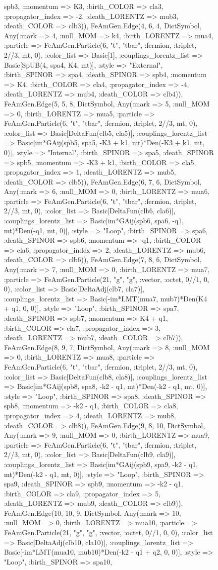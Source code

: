 \documentclass{revtex4}
\begin{document}
\begin{figure}[!htb]
\begin{center}
{spb3, :momentum => K3, :birth_COLOR => cla3, :propagator_index => -2, :death_LORENTZ => mub3, :death_COLOR => clb3)), FeAmGen.Edge(4, 6, 4, Dict{Symbol, Any}(:mark => 4, :null_MOM => k4, :birth_LORENTZ => mua4, :particle => FeAmGen.Particle(6, "t", "tbar", :fermion, :triplet, 2//3, mt, 0), :color_list => Basic[1], :couplings_lorentz_list => Basic[SpUB(4, spa4, K4, mt)], :style => "External", :birth_SPINOR => spa4, :death_SPINOR => spb4, :momentum => K4, :birth_COLOR => cla4, :propagator_index => -4, :death_LORENTZ => mub4, :death_COLOR => clb4)), FeAmGen.Edge(5, 5, 8, Dict{Symbol, Any}(:mark => 5, :null_MOM => 0, :birth_LORENTZ => mua5, :particle => FeAmGen.Particle(6, "t", "tbar", :fermion, :triplet, 2//3, mt, 0), :color_list => Basic[DeltaFun(clb5, cla5)], :couplings_lorentz_list => Basic[im*GAij(spb5, spa5, -K3 + k1, mt)*Den(-K3 + k1, mt, 0)], :style => "Internal", :birth_SPINOR => spa5, :death_SPINOR => spb5, :momentum => -K3 + k1, :birth_COLOR => cla5, :propagator_index => 1, :death_LORENTZ => mub5, :death_COLOR => clb5)), FeAmGen.Edge(6, 7, 6, Dict{Symbol, Any}(:mark => 6, :null_MOM => 0, :birth_LORENTZ => mua6, :particle => FeAmGen.Particle(6, "t", "tbar", :fermion, :triplet, 2//3, mt, 0), :color_list => Basic[DeltaFun(clb6, cla6)], :couplings_lorentz_list => Basic[im*GAij(spb6, spa6, -q1, mt)*Den(-q1, mt, 0)], :style => "Loop", :birth_SPINOR => spa6, :death_SPINOR => spb6, :momentum => -q1, :birth_COLOR => cla6, :propagator_index => 2, :death_LORENTZ => mub6, :death_COLOR => clb6)), FeAmGen.Edge(7, 8, 6, Dict{Symbol, Any}(:mark => 7, :null_MOM => 0, :birth_LORENTZ => mua7, :particle => FeAmGen.Particle(21, "g", "g", :vector, :octet, 0//1, 0, 0), :color_list => Basic[DeltaAdj(clb7, cla7)], :couplings_lorentz_list => Basic[-im*LMT(mua7, mub7)*Den(K4 + q1, 0, 0)], :style => "Loop", :birth_SPINOR => spa7, :death_SPINOR => spb7, :momentum => K4 + q1, :birth_COLOR => cla7, :propagator_index => 3, :death_LORENTZ => mub7, :death_COLOR => clb7)), FeAmGen.Edge(8, 9, 7, Dict{Symbol, Any}(:mark => 8, :null_MOM => 0, :birth_LORENTZ => mua8, :particle => FeAmGen.Particle(6, "t", "tbar", :fermion, :triplet, 2//3, mt, 0), :color_list => Basic[DeltaFun(clb8, cla8)], :couplings_lorentz_list => Basic[im*GAij(spb8, spa8, -k2 - q1, mt)*Den(-k2 - q1, mt, 0)], :style => "Loop", :birth_SPINOR => spa8, :death_SPINOR => spb8, :momentum => -k2 - q1, :birth_COLOR => cla8, :propagator_index => 4, :death_LORENTZ => mub8, :death_COLOR => clb8)), FeAmGen.Edge(9, 8, 10, Dict{Symbol, Any}(:mark => 9, :null_MOM => 0, :birth_LORENTZ => mua9, :particle => FeAmGen.Particle(6, "t", "tbar", :fermion, :triplet, 2//3, mt, 0), :color_list => Basic[DeltaFun(clb9, cla9)], :couplings_lorentz_list => Basic[im*GAij(spb9, spa9, -k2 - q1, mt)*Den(-k2 - q1, mt, 0)], :style => "Loop", :birth_SPINOR => spa9, :death_SPINOR => spb9, :momentum => -k2 - q1, :birth_COLOR => cla9, :propagator_index => 5, :death_LORENTZ => mub9, :death_COLOR => clb9)), FeAmGen.Edge(10, 10, 9, Dict{Symbol, Any}(:mark => 10, :null_MOM => 0, :birth_LORENTZ => mua10, :particle => FeAmGen.Particle(21, "g", "g", :vector, :octet, 0//1, 0, 0), :color_list => Basic[DeltaAdj(clb10, cla10)], :couplings_lorentz_list => Basic[-im*LMT(mua10, mub10)*Den(-k2 - q1 + q2, 0, 0)], :style => "Loop", :birth_SPINOR => spa10, }
\end{center}
\end{figure}
\end{document}

